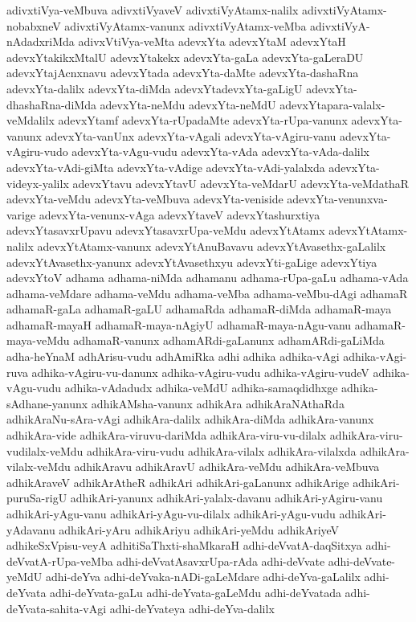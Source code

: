 {adivxtiVya-veMbuva
adivxtiVyaveV
adivxtiVyAtamx-nalilx
adivxtiVyAtamx-nobabxneV
adivxtiVyAtamx-vanunx
adivxtiVyAtamx-veMba
adivxtiVyA-nAdadxriMda
adivxVtiVya-veMta
adevxYta
adevxYtaM
adevxYtaH
adevxYtakikxMtalU
adevxYtakekx
adevxYta-gaLa
adevxYta-gaLeraDU
adevxYtajAcnxnavu
adevxYtada
adevxYta-daMte
adevxYta-dashaRna
adevxYta-dalilx
adevxYta-diMda
adevxYtadevxYta-gaLigU
adevxYta-dhashaRna-diMda
adevxYta-neMdu
adevxYta-neMdU
adevxYtapara-valalx-veMdalilx
adevxYtamf
adevxYta-rUpadaMte
adevxYta-rUpa-vanunx
adevxYta-vanunx
adevxYta-vanUnx
adevxYta-vAgali
adevxYta-vAgiru-vanu
adevxYta-vAgiru-vudo
adevxYta-vAgu-vudu
adevxYta-vAda
adevxYta-vAda-dalilx
adevxYta-vAdi-giMta
adevxYta-vAdige
adevxYta-vAdi-yalalxda
adevxYta-videyx-yalilx
adevxYtavu
adevxYtavU
adevxYta-veMdarU
adevxYta-veMdathaR
adevxYta-veMdu
adevxYta-veMbuva
adevxYta-veniside
adevxYta-venunxva-varige
adevxYta-venunx-vAga
adevxYtaveV
adevxYtashurxtiya
adevxYtasavxrUpavu
adevxYtasavxrUpa-veMdu
adevxYtAtamx
adevxYtAtamx-nalilx
adevxYtAtamx-vanunx
adevxYtAnuBavavu
adevxYtAvasethx-gaLalilx
adevxYtAvasethx-yanunx
adevxYtAvasethxyu
adevxYti-gaLige
adevxYtiya
adevxYtoV
adhama
adhama-niMda
adhamanu
adhama-rUpa-gaLu
adhama-vAda
adhama-veMdare
adhama-veMdu
adhama-veMba
adhama-veMbu-dAgi
adhamaR
adhamaR-gaLa
adhamaR-gaLU
adhamaRda
adhamaR-diMda
adhamaR-maya
adhamaR-mayaH
adhamaR-maya-nAgiyU
adhamaR-maya-nAgu-vanu
adhamaR-maya-veMdu
adhamaR-vanunx
adhamARdi-gaLanunx
adhamARdi-gaLiMda
adha-heYnaM
adhArisu-vudu
adhAmiRka
adhi
adhika
adhika-vAgi
adhika-vAgi-ruva
adhika-vAgiru-vu-danunx
adhika-vAgiru-vudu
adhika-vAgiru-vudeV
adhika-vAgu-vudu
adhika-vAdadudx
adhika-veMdU
adhika-samaqdidhxge
adhika-sAdhane-yanunx
adhikAMsha-vanunx
adhikAra
adhikAraNAthaRda
adhikAraNu-sAra-vAgi
adhikAra-dalilx
adhikAra-diMda
adhikAra-vanunx
adhikAra-vide
adhikAra-viruvu-dariMda
adhikAra-viru-vu-dilalx
adhikAra-viru-vudilalx-veMdu
adhikAra-viru-vudu
adhikAra-vilalx
adhikAra-vilalxda
adhikAra-vilalx-veMdu
adhikAravu
adhikAravU
adhikAra-veMdu
adhikAra-veMbuva
adhikAraveV
adhikArAtheR
adhikAri
adhikAri-gaLanunx
adhikArige
adhikAri-puruSa-rigU
adhikAri-yanunx
adhikAri-yalalx-davanu
adhikAri-yAgiru-vanu
adhikAri-yAgu-vanu
adhikAri-yAgu-vu-dilalx
adhikAri-yAgu-vudu
adhikAri-yAdavanu
adhikAri-yAru
adhikAriyu
adhikAri-yeMdu
adhikAriyeV
adhikeSxVpisu-veyA
adhitiSaThxti-shaMkaraH
adhi-deVvatA-daqSitxya
adhi-deVvatA-rUpa-veMba
adhi-deVvatAsavxrUpa-rAda
adhi-deVvate
adhi-deVvate-yeMdU
adhi-deYva
adhi-deYvaka-nADi-gaLeMdare
adhi-deYva-gaLalilx
adhi-deYvata
adhi-deYvata-gaLu
adhi-deYvata-gaLeMdu
adhi-deYvatada
adhi-deYvata-sahita-vAgi
adhi-deYvateya
adhi-deYva-dalilx
}
